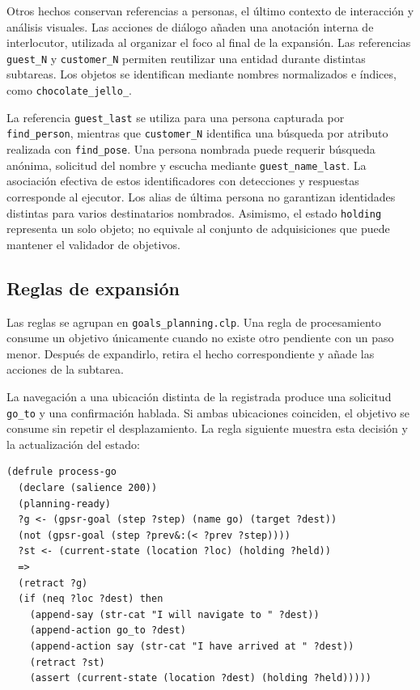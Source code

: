Otros hechos conservan referencias a personas, el último contexto de
interacción y análisis visuales. Las acciones de diálogo añaden una
anotación interna de interlocutor, utilizada al organizar el foco al
final de la expansión. Las referencias
\texttt{guest\_N} y \texttt{customer\_N} permiten reutilizar una entidad
durante distintas subtareas. Los objetos se identifican mediante nombres
normalizados e índices, como \texttt{chocolate\_\allowbreak jello\_}.

La referencia \texttt{guest\_last} se utiliza para una persona capturada
por \texttt{find\_person}, mientras que \texttt{customer\_N} identifica
una búsqueda por atributo realizada con \texttt{find\_pose}. Una persona
nombrada puede requerir búsqueda anónima, solicitud del nombre y escucha
mediante \texttt{guest\_\allowbreak name\_\allowbreak last}. La asociación efectiva de estos
identificadores con detecciones y respuestas corresponde al ejecutor.
Los alias de última persona no garantizan identidades distintas para
varios destinatarios nombrados. Asimismo, el estado \texttt{holding}
representa un solo objeto; no equivale al conjunto de adquisiciones
que puede mantener el validador de objetivos.

\subsection{Reglas de expansión}

Las reglas se agrupan en \texttt{goals\_\allowbreak planning.\allowbreak clp}. Una regla de
procesamiento consume un objetivo únicamente cuando no existe otro
pendiente con un paso menor. Después de expandirlo, retira el hecho
correspondiente y añade las acciones de la subtarea.

La navegación a una ubicación distinta de la registrada produce una
solicitud \texttt{go\_to} y una confirmación hablada. Si ambas ubicaciones
coinciden, el objetivo se consume sin repetir el desplazamiento. La
regla siguiente muestra esta decisión y la actualización del estado:

{\scriptsize
\begin{verbatim}
(defrule process-go
  (declare (salience 200))
  (planning-ready)
  ?g <- (gpsr-goal (step ?step) (name go) (target ?dest))
  (not (gpsr-goal (step ?prev&:(< ?prev ?step))))
  ?st <- (current-state (location ?loc) (holding ?held))
  =>
  (retract ?g)
  (if (neq ?loc ?dest) then
    (append-say (str-cat "I will navigate to " ?dest))
    (append-action go_to ?dest)
    (append-action say (str-cat "I have arrived at " ?dest))
    (retract ?st)
    (assert (current-state (location ?dest) (holding ?held)))))
\end{verbatim}
}

